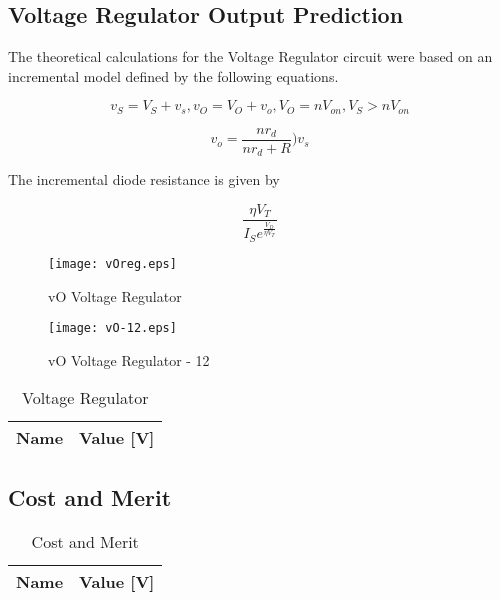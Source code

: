 \subsection{Voltage Regulator Output Prediction}
\label{vr}

The theoretical calculations for the Voltage Regulator circuit were based on an incremental model defined by the following equations.

\begin{equation}
v_S=V_S+v_s , v_O=V_O+v_o , V_O=nV_{on} , V_S>nV_{on}
\label{eq:kvl7}
\end{equation}

\begin{equation}
v_o=\frac{nr_d}{nr_d+R})v_s
\label{eq:kvl8}
\end{equation}

The incremental diode resistance is given by

\begin{equation}
\frac{\eta V_T}{I_Se^{\frac{V_D}{\eta V_T}}}
\label{eq:kvl9}
\end{equation}


\begin{figure}[h] \centering
\texttt{[image: vOreg.eps]}
\caption{vO Voltage Regulator}
\label{fig:vOreg}
\end{figure}


\begin{figure}[h] \centering
\texttt{[image: vO-12.eps]}
\caption{vO Voltage Regulator - 12}
\label{fig:vO-12}
\end{figure}


\begin{table}[h]
  \centering
  \begin{tabular}{|l|r|}
    \hline    
    {\bf Name} & {\bf Value [V]} \\ \hline
    
  \end{tabular}
  \caption{Voltage Regulator}
  \label{tab:Regulator}
\end{table}
\FloatBarrier

\subsection{Cost and Merit}
\label{cm}


\begin{table}[h]
  \centering
  \begin{tabular}{|l|r|}
    \hline    
    {\bf Name} & {\bf Value [V]} \\ \hline
    
  \end{tabular}
  \caption{Cost and Merit}
  \label{tab:Merit}
\end{table}
\FloatBarrier






